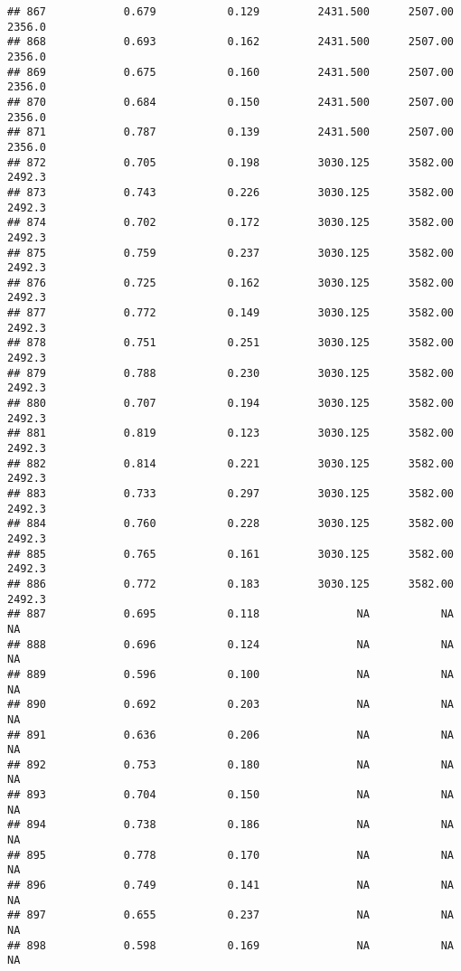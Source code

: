 \documentclass[
]{article}
\begin{document}
\begin{verbatim}
## 867            0.679           0.129         2431.500      2507.00       2356.0
## 868            0.693           0.162         2431.500      2507.00       2356.0
## 869            0.675           0.160         2431.500      2507.00       2356.0
## 870            0.684           0.150         2431.500      2507.00       2356.0
## 871            0.787           0.139         2431.500      2507.00       2356.0
## 872            0.705           0.198         3030.125      3582.00       2492.3
## 873            0.743           0.226         3030.125      3582.00       2492.3
## 874            0.702           0.172         3030.125      3582.00       2492.3
## 875            0.759           0.237         3030.125      3582.00       2492.3
## 876            0.725           0.162         3030.125      3582.00       2492.3
## 877            0.772           0.149         3030.125      3582.00       2492.3
## 878            0.751           0.251         3030.125      3582.00       2492.3
## 879            0.788           0.230         3030.125      3582.00       2492.3
## 880            0.707           0.194         3030.125      3582.00       2492.3
## 881            0.819           0.123         3030.125      3582.00       2492.3
## 882            0.814           0.221         3030.125      3582.00       2492.3
## 883            0.733           0.297         3030.125      3582.00       2492.3
## 884            0.760           0.228         3030.125      3582.00       2492.3
## 885            0.765           0.161         3030.125      3582.00       2492.3
## 886            0.772           0.183         3030.125      3582.00       2492.3
## 887            0.695           0.118               NA           NA           NA
## 888            0.696           0.124               NA           NA           NA
## 889            0.596           0.100               NA           NA           NA
## 890            0.692           0.203               NA           NA           NA
## 891            0.636           0.206               NA           NA           NA
## 892            0.753           0.180               NA           NA           NA
## 893            0.704           0.150               NA           NA           NA
## 894            0.738           0.186               NA           NA           NA
## 895            0.778           0.170               NA           NA           NA
## 896            0.749           0.141               NA           NA           NA
## 897            0.655           0.237               NA           NA           NA
## 898            0.598           0.169               NA           NA           NA

\end{verbatim}
\end{document}
